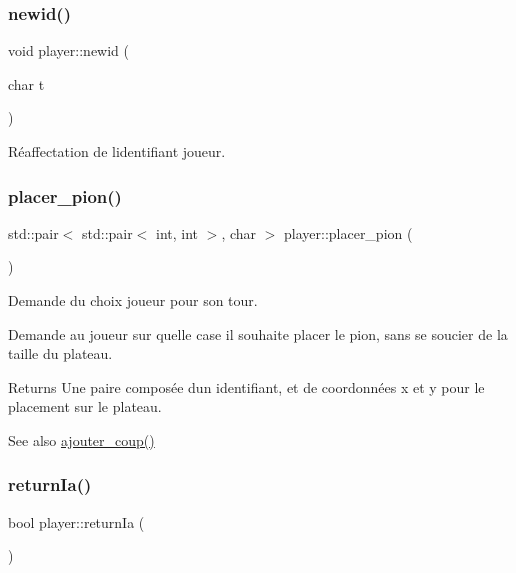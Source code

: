 \subsubsection{\texorpdfstring{newid()}{newid()}}
{\footnotesize\ttfamily void player\+::newid (\begin{DoxyParamCaption}\item[{char}]{t }\end{DoxyParamCaption})\hspace{0.3cm}{\ttfamily [inline]}}



Réaffectation de l\textquotesingle{}identifiant joueur. 

\mbox{\label{classplayer_a34f3624d4410230ab77ce6ee7fb0a0df}} 
\subsubsection{\texorpdfstring{placer\+\_\+pion()}{placer\_pion()}}
{\footnotesize\ttfamily std\+::pair$<$ std\+::pair$<$ int, int $>$, char $>$ player\+::placer\+\_\+pion (\begin{DoxyParamCaption}{ }\end{DoxyParamCaption})}



Demande du choix joueur pour son tour. 

Demande au joueur sur quelle case il souhaite placer le pion, sans se soucier de la taille du plateau. \begin{DoxyReturn}{Returns}
Une paire composée d\textquotesingle{}un identifiant, et de coordonnées x et y pour le placement sur le plateau. 
\end{DoxyReturn}
\begin{DoxySeeAlso}{See also}
\hyperlink{classplayer_aec3e561bd70f63c9b1dd0614afc2971a}{ajouter\+\_\+coup()} 
\end{DoxySeeAlso}
\mbox{\label{classplayer_ac9ddc8bf95e4b1fc87658a3d8426b394}} 
\subsubsection{\texorpdfstring{return\+Ia()}{returnIa()}}
{\footnotesize\ttfamily bool player\+::return\+Ia (\begin{DoxyParamCaption}{ }\end{DoxyParamCaption})\hspace{0.3cm}{\ttfamily [inline]}}



